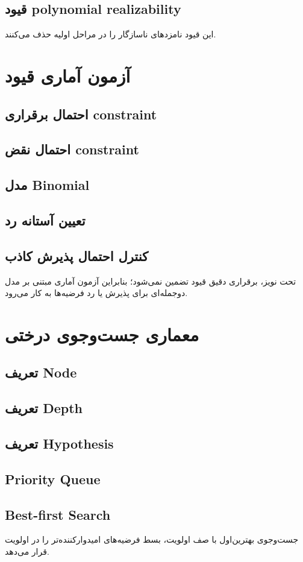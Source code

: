 \subsection{قیود polynomial realizability}
این قیود نامزدهای ناسازگار را در مراحل اولیه حذف می‌کنند.

\section{آزمون آماری قیود}
\subsection{احتمال برقراری constraint}
\subsection{احتمال نقض constraint}
\subsection{مدل Binomial}
\subsection{تعیین آستانه رد}
\subsection{کنترل احتمال پذیرش کاذب}
تحت نویز، برقراری دقیق قیود تضمین نمی‌شود؛ بنابراین آزمون آماری مبتنی بر مدل دوجمله‌ای برای پذیرش یا رد فرضیه‌ها به کار می‌رود.

\section{معماری جست‌وجوی درختی}
\subsection{تعریف Node}
\subsection{تعریف Depth}
\subsection{تعریف Hypothesis}
\subsection{Priority Queue}
\subsection{Best-first Search}
جست‌وجوی بهترین‌اول با صف اولویت، بسط فرضیه‌های امیدوارکننده‌تر را در اولویت قرار می‌دهد.

